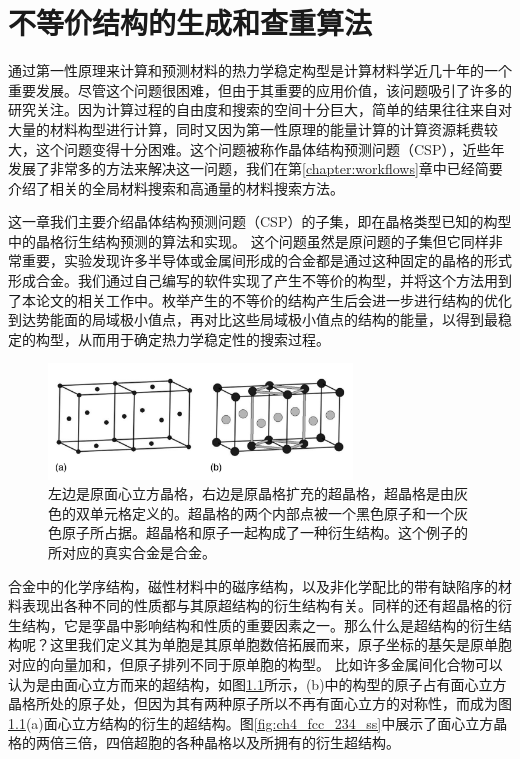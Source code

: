 \chapter{不等价结构的生成和查重算法}\label{chapter:unique}
通过第一性原理来计算和预测材料的热力学稳定构型是计算材料学近几十年的一个重要发展。尽管这个问题很困难，但由于其重要的应用价值，该问题吸引了许多的研究关注。因为计算过程的自由度和搜索的空间十分巨大，简单的结果往往来自对大量的材料构型进行计算，同时又因为第一性原理的能量计算的计算资源耗费较大，这个问题变得十分困难。这个问题被称作晶体结构预测问题（CSP），近些年发展了非常多的方法来解决这一问题，我们在第\ref{chapter:workflows}章中已经简要介绍了相关的全局材料搜索和高通量的材料搜索方法。

这一章我们主要介绍晶体结构预测问题（CSP）的子集，即在晶格类型已知的构型中的晶格衍生结构预测的算法和实现。
这个问题虽然是原问题的子集但它同样非常重要，实验发现许多半导体或金属间形成的合金都是通过这种固定的晶格的形式形成合金。我们通过自己编写的软件实现了产生不等价的构型，并将这个方法用到了本论文的相关工作中。枚举产生的不等价的结构产生后会进一步进行结构的优化到达势能面的局域极小值点，再对比这些局域极小值点的结构的能量，以得到最稳定的构型，从而用于确定热力学稳定性的搜索过程。

\begin{figure}
  \includegraphics[width=0.72\textwidth]{figs/ch4_fcc_superlattice.png}
  \centering
  \caption{左边是原面心立方晶格，右边是原晶格扩充的超晶格，超晶格是由灰色的双单元格定义的。超晶格的两个内部点被一个黑色原子和一个灰色原子所占据。超晶格和原子一起构成了一种衍生结构。这个例子的所对应的真实合金是合金。}
  \label{fig:ch4_fcc_superlattice}
\end{figure}

合金中的化学序结构，磁性材料中的磁序结构，以及非化学配比的带有缺陷序的材料表现出各种不同的性质都与其原超结构的衍生结构\cite{buerger1947derivative,santoro1973coincidence,santoro1972properties}有关。同样的还有超晶格的衍生结构，它是孪晶中影响结构和性质的重要因素之一。那么什么是超结构的衍生结构呢？这里我们定义其为单胞是其原单胞数倍拓展而来，原子坐标的基矢是原单胞对应的向量加和，但原子排列不同于原单胞的构型。
比如许多金属间化合物可以认为是由面心立方而来的超结构，如图\ref{fig:ch4_fcc_superlattice}所示，(b)中的构型的原子占有面心立方晶格所处的原子处，但因为其有两种原子所以不再有面心立方的对称性，而成为图\ref{fig:ch4_fcc_superlattice}(a)面心立方结构的衍生的超结构。图\ref{fig:ch4_fcc_234_ss}中展示了面心立方晶格的两倍三倍，四倍超胞的各种晶格以及所拥有的衍生超结构。

